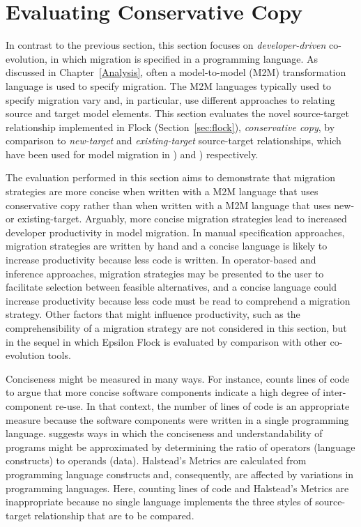 
\section{Evaluating Conservative Copy}
\label{sec:quantitive}
In contrast to the previous section, this section focuses on \emph{developer-driven} co-evolution, in which migration is specified in a programming language. As discussed in Chapter~\ref{Analysis}, often a model-to-model (M2M) transformation language is used to specify migration. The M2M languages typically used to specify migration vary and, in particular, use different approaches to relating source and target model elements. This section evaluates the novel source-target relationship implemented in Flock (Section~\ref{sec:flock}), \emph{conservative copy}, by comparison to \emph{new-target} and \emph{existing-target} source-target relationships, which have been used for model migration in \cite{cicchetti08automating,garces09managing}) and \cite{herrmannsdoerfer09cope,hussey06advanced}) respectively.

The evaluation performed in this section aims to demonstrate that migration strategies are more concise when written with a M2M language that uses conservative copy rather than when written with a M2M language that uses new- or existing-target. Arguably, more concise migration strategies lead to increased developer productivity in model migration. In manual specification approaches, migration strategies are written by hand and a concise language is likely to increase productivity because less code is written. In operator-based and inference approaches, migration strategies may be presented to the user to facilitate selection between feasible alternatives, and a concise language could increase productivity because less code must be read to comprehend a migration strategy. Other factors that might influence productivity, such as the comprehensibility of a migration strategy are not considered in this section, but in the sequel in which Epsilon Flock is evaluated by comparison with other co-evolution tools.

Conciseness might be measured in many ways. For instance, \cite{kolovos09thesis} counts lines of code to argue that more concise software components indicate a high degree of inter-component re-use. In that context, the number of lines of code is an appropriate measure because the software components were written in a single programming language. \cite{halstead77softwarescience} suggests ways in which the conciseness and understandability of programs might be approximated by determining the ratio of operators (language constructs) to operands (data). Halstead's Metrics are calculated from programming language constructs and, consequently, are affected by variations in programming languages. Here, counting lines of code and Halstead's Metrics are inappropriate because no single language implements the three styles of source-target relationship that are to be compared.

